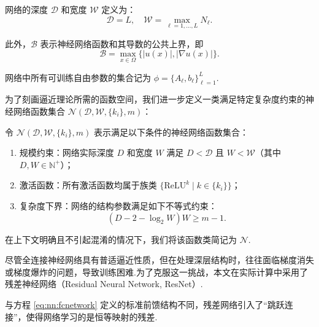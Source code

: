 \begin{definition}[神经网络的参数]
网络的深度 $\mathcal{D}$ 和宽度 $\mathcal{W}$ 定义为：
\begin{equation*}
\mathcal{D} = L, \quad \mathcal{W} = \max_{\ell=1, \dots, L} N_{\ell}.
\end{equation*}

此外，$\mathcal{B}$ 表示神经网络函数和其导数的公共上界，即
\begin{equation*}
\mathcal{B}=\max_{x\in \Omega}\{|u(x)|,|\nabla u(x)|\}. 
\end{equation*}

网络中所有可训练自由参数的集合记为 $\phi = \{A_{\ell}, b_{\ell}\}_{\ell=1}^{L}$.
\end{definition}

为了刻画逼近理论所需的函数空间，我们进一步定义一类满足特定复杂度约束的神经网络函数集合 $\mathcal{N}(\mathcal{D}, \mathcal{W}, \{k_{i}\}, m)$：

\begin{definition}
令 $\mathcal{N}(\mathcal{D}, \mathcal{W}, \{k_{i}\}, m)$ 表示满足以下条件的神经网络函数集合：
\begin{enumerate}
    \item {\heiti 规模约束}：网络实际深度 $D$ 和宽度 $W$ 满足 $D < \mathcal{D}$ 且 $W < \mathcal{W}$（其中 $D, W \in \mathbb{N}^+$）；
    \item {\heiti 激活函数}：所有激活函数均属于族类 $\{\mathrm{ReLU}^{k} \mid k \in \{k_{i}\}\}$；
    \item {\heiti 复杂度下界}：网络的结构参数满足如下不等式约束：
    \begin{equation}
        (D - 2 - \log_{2} W) W \geq m - 1.
    \end{equation}
\end{enumerate}
在上下文明确且不引起混淆的情况下，我们将该函数类简记为 $\mathcal{N}$.
\end{definition}

尽管全连接神经网络具有普适逼近性质，但在处理深层结构时，往往面临梯度消失或梯度爆炸的问题，导致训练困难.为了克服这一挑战，本文在实际计算中采用了残差神经网络（Residual Neural Network, ResNet）\cite{he2015deep}.

与方程 \eqref{eq:nn:fcnetwork} 定义的标准前馈结构不同，残差网络引入了“跳跃连接”，使得网络学习的是恒等映射的残差.

